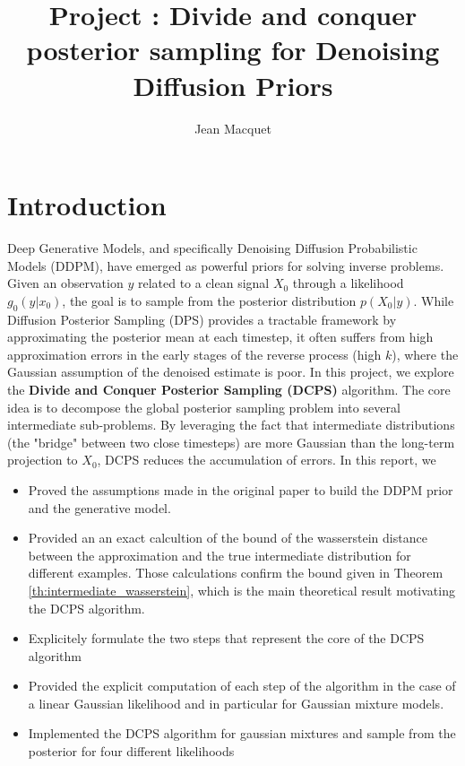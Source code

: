 \documentclass[12pt]{article}
\title{Project : Divide and conquer posterior sampling for Denoising Diffusion Priors}
\author{Jean Macquet}
\begin{document}
\maketitle

\section{Introduction}
Deep Generative Models, and specifically Denoising Diffusion Probabilistic Models (DDPM), 
have emerged as powerful priors for solving inverse problems. 
Given an observation $y$ related to a clean signal $X_0$ through a 
likelihood $g_0(y|x_0)$, the goal is to sample from the posterior distribution $p(X_0|y)$. 
While Diffusion Posterior Sampling (DPS) provides a tractable framework by approximating 
the posterior mean at each timestep, it often suffers from high approximation errors 
in the early stages of the reverse process (high $k$), where the Gaussian assumption 
of the denoised estimate is poor.
\newline
\newline
In this project, we explore the \textbf{Divide and Conquer Posterior Sampling (DCPS)} algorithm. 
The core idea is to decompose the global posterior sampling problem into several intermediate sub-problems. 
By leveraging the fact that intermediate distributions (the "bridge" between two close timesteps) 
are more Gaussian than the long-term projection to $X_0$, DCPS reduces the accumulation of errors.
\newline
\newline
In this report, we 
\begin{itemize}
    \item Proved the assumptions made in the original paper to build the DDPM prior and the generative model.
    \item Provided an an exact calcultion of the bound of the wasserstein distance between the approximation 
    and the true intermediate distribution for different examples. Those calculations confirm the bound given in Theorem \ref{th:intermediate_wasserstein},
    which is the main theoretical result motivating the DCPS algorithm. 
    \item Explicitely formulate the two steps that represent the core of the DCPS algorithm
    \item Provided the explicit computation of each step of the algorithm in the case of a linear Gaussian 
    likelihood and in particular for Gaussian mixture models.
    \item Implemented the DCPS algorithm for gaussian mixtures and sample from the posterior 
    for four different likelihoods
\end{itemize}
\end{document}
